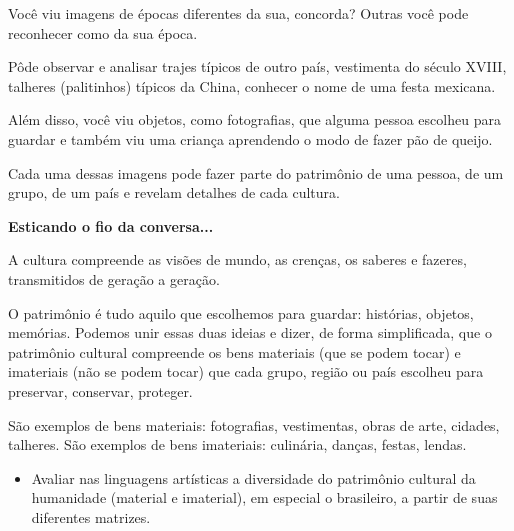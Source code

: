 \begin{escolha}
{Você viu imagens de épocas diferentes da sua, concorda? Outras você pode
reconhecer como da sua época.

Pôde observar e analisar trajes típicos de outro país, vestimenta do
século XVIII, talheres (palitinhos) típicos da China, conhecer o nome de
uma festa mexicana.

Além disso, você viu objetos, como fotografias, que alguma pessoa
escolheu para guardar e também viu uma criança aprendendo o modo de
fazer pão de queijo.

Cada uma dessas imagens pode fazer parte do patrimônio de uma pessoa, de
um grupo, de um país e revelam detalhes de cada cultura.

\textbf{Esticando o fio da conversa...}

A cultura compreende as visões de mundo, as crenças, os saberes e
fazeres, transmitidos de geração a geração.

O patrimônio é tudo aquilo que escolhemos para guardar: histórias,
objetos, memórias. Podemos unir essas duas ideias e dizer, de forma
simplificada, que o patrimônio cultural compreende os bens materiais
(que se podem tocar) e imateriais (não se podem tocar) que cada grupo,
região ou país escolheu para preservar, conservar, proteger.

São exemplos de bens materiais: fotografias, vestimentas, obras de arte,
cidades, talheres. São exemplos de bens imateriais: culinária, danças,
festas, lendas.}



\begin{itemize}
\item Avaliar nas linguagens artísticas a diversidade do patrimônio cultural
da humanidade (material e imaterial), em especial o brasileiro, a partir
de suas diferentes matrizes.
\end{itemize}


\end{escolha}
